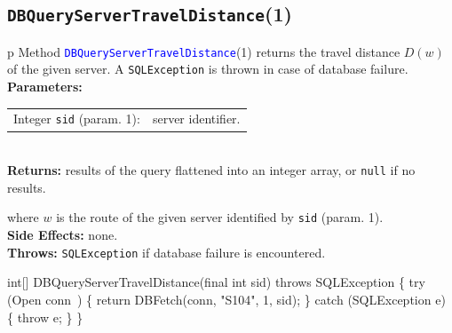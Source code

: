 \subsection{{\tt{}\protect{}DBQueryServerTravelDistance}(1)}
\begin{tabular}{p{\textwidth}}
\toprule
{}
Method \textcolor{blue}{{\tt{}\protect{}DBQueryServerTravelDistance}}(1) returns the
travel distance $D(w)$ of the given server.
A {\tt{}SQLException} is thrown in case of database failure.\\
\midrule
\textbf{Parameters:} \\
\begin{tabular}{lp{116mm}}
Integer {\tt{}sid} (param. 1):&server identifier.
\end{tabular}\\
\textbf{Returns:} results of the query flattened into an integer array,
or {\tt{}null} if no results.


where $w$ is the route of the given server identified by {\tt{}sid} (param. 1).\\
\textbf{Side Effects:} none.\\
\textbf{Throws:} {\tt{}SQLException} if database failure is encountered.\\
\bottomrule
\end{tabular}
\nwenddocs{}\endmoddef{}
int[] DBQueryServerTravelDistance(final int sid) throws SQLException \{
  try (\LA{}Open \code{}conn\edoc{}~{\nwtagstyle{}}\RA{}) \{
    return DBFetch(conn, "S104", 1, sid);
  \} catch (SQLException e) \{
    throw e;
  \}
\}
\eatline
{}\nwendcode{}\nwdocspar
